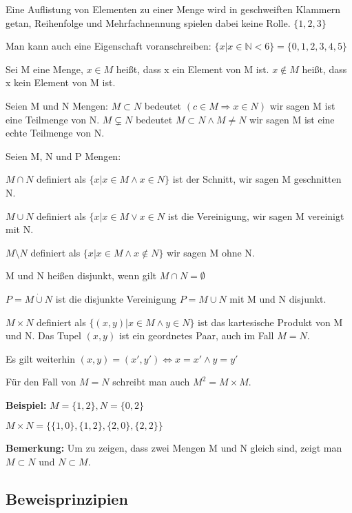\documentclass[pdftex,12pt,a4paper,fleqn]{scrartcl}
\begin{document}
Eine Auflistung von Elementen zu einer Menge wird in geschweiften Klammern getan, Reihenfolge und Mehrfachnennung spielen dabei keine Rolle. $\{1,2,3\}$

Man kann auch eine Eigenschaft voranschreiben: $\{x | x \in \mathbb{N} < 6\} = \{0,1,2,3,4,5\}$

Sei M eine Menge, $x \in M $ heißt, dass x ein Element von M ist. $x \notin M$ heißt, dass x kein Element von M ist.

Seien M und N Mengen: $M \subset N$ bedeutet $(c \in M \Rightarrow x \in N)$ wir sagen M ist eine Teilmenge von N. $M \subsetneq N$ bedeutet $M \subset N \land M \neq N$ wir sagen M ist eine echte Teilmenge von N.

Seien M, N und P Mengen:

$M \cap N$ definiert als $\{x | x \in M \land x \in N\}$ ist der Schnitt, wir sagen M geschnitten N.

$M \cup N$ definiert als $\{x | x \in M \lor x \in N$ ist die Vereinigung, wir sagen M vereinigt mit N.

$M \setminus N$ definiert als $\{x | x \in M \land x \notin N\} $ wir sagen M ohne N. 

M und N heißen disjunkt, wenn gilt $M \cap N = \emptyset$

$P = M \mathbin{\dot{\cup}} N$ ist die disjunkte Vereinigung $P = M \cup N$ mit M und N disjunkt.

$M \times N$ definiert als $\{(x,y) | x \in M \land y \in N\}$ ist das kartesische Produkt von M und N. Das Tupel $(x,y)$ ist ein geordnetes Paar, auch im Fall $M=N$. 

Es gilt weiterhin $(x,y)=(x',y') \Leftrightarrow x=x' \land y=y'$

Für den Fall von $M = N$ schreibt man auch $M^2 = M \times M$.

\textbf{Beispiel:} $M=\{1,2\}, N=\{0,2\}$

$M \times N = \{\{1,0\},\{1,2\},\{2,0\},\{2,2\}\}$

\textbf{Bemerkung:} Um zu zeigen, dass zwei Mengen M und N gleich sind, zeigt man $M \subset N$ und $N \subset M$.



\subsection{Beweisprinzipien} %
\label{sub:beweisprinzipien}
\end{document}
